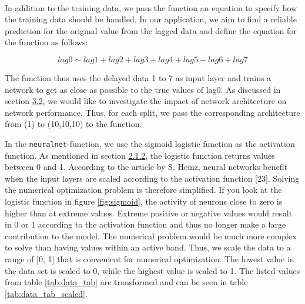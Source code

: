 \documentclass[
]{article}
\begin{document}
~

In addition to the training data, we pass the function an equation to
specify how the training data should be handled. In our application, we
aim to find a reliable prediction for the original value from the lagged
data and define the equation for the function as follows:

\[lag0 \sim lag1+lag2+lag3+lag4+lag5+lag6+lag7\]

The function thus uses the delayed data 1 to 7 as input layer and trains
a network to get as close as possible to the true values of lag0. As
discussed in section \protect\hyperlink{networkarchitecture}{3.2}, we
would like to investigate the impact of network architecture on network
performance. Thus, for each split, we pass the corresponding
architecture from (1) to (10,10,10) to the function.

In the \texttt{neuralnet}-function, we use the sigmoid logistic function
as the activation function. As mentioned in section
\protect\hyperlink{backprogation_algorithm}{2.1.2}, the logistic
function returns values between 0 and 1. According to the article by S.
Heinz, neural networks benefit when the input layers are scaled
according to the activation function {[}23{]}. Solving the numerical
optimization problem is therefore simplified. If you look at the
logistic function in figure \ref{fig:sigmoid}, the activity of neurons
close to zero is higher than at extreme values. Extreme positive or
negative values would result in 0 or 1 according to the activation
function and thus no longer make a large contribution to the model. The
numerical problem would be much more complex to solve than having values
within an active band. Thus, we scale the data to a range of {[}0, 1{]}
that is convenient for numerical optimization. The lowest value in the
data set is scaled to 0, while the highest value is scaled to 1. The
listed values from table \ref{tab:data_tab} are transformed and can be
seen in table \ref{tab:data_tab_scaled}.

\newpage
\end{document}
